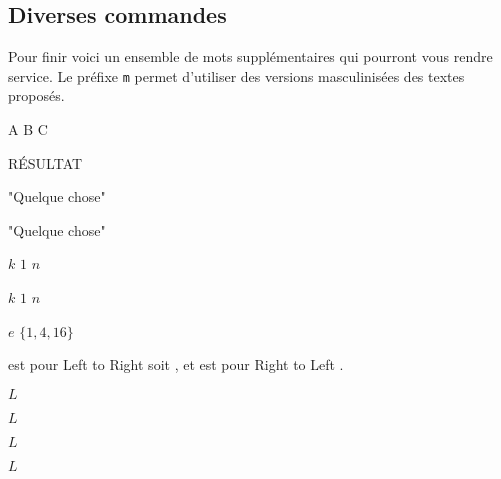 \documentclass[12pt,a4paper]{article}
\begin{document}

\subsection{Diverses commandes}

Pour finir voici un ensemble de mots supplémentaires qui pourront vous rendre service. Le préfixe \verb+m+ permet d'utiliser des versions \og masculinisées \fg{} des textes proposés.


\begin{latexex}
A \And B \Or C
\end{latexex}





\begin{latexex}
\Return RÉSULTAT

\Ask "Quelque chose"

\Print "Quelque chose"
\end{latexex}





\begin{latexex}
$k$ \From $1$ \To $n$

$k$ \ComingFrom $1$ \GoingTo $n$
\end{latexex}





\begin{latexex}
$e$ \InThis $\{ 1 , 4 , 16 \}$
\end{latexex}





 est pour \og Left to Right \fg{} soit , et  est pour \og Right to Left \fg{}.


\begin{latexex}
$L$ \LtoR

$L$ \mLtoR

$L$ \RtoL

$L$ \mRtoL
\end{latexex}
\end{document}
